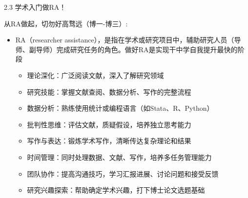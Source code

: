 \documentclass[10pt,aspectratio=43,mathserif,table]{beamer}
\begin{document}
\begin{frame}{\small 2.3 学术入门做RA！}
	
	\begin{block}{\footnotesize 从RA做起，切勿好高骛远（博一-博三）:}
		\begin{itemize}
			\item \footnotesize RA（researcher assistance），是指在学术或研究项目中，辅助研究人员（导师、副导师）完成研究任务的角色。做好RA是实现干中学自我提升最快的阶段
			\vspace{0.4em}
			\begin{itemize}
				\item \footnotesize 理论深化：广泛阅读文献，深入了解研究领域
			\end{itemize}
			\vspace{0.4em}
			\begin{itemize}
				\item \footnotesize 研究技能：掌握文献查阅、数据分析、写作的完整流程
			\end{itemize}
			\vspace{0.4em}
			\begin{itemize}
				\item \footnotesize 数据分析：熟练使用统计或编程语言（如Stata、R、Python）
			\end{itemize}
			\vspace{0.4em}
			\begin{itemize}
				\item \footnotesize 批判性思维：评估文献，质疑假设，培养独立思考能力
			\end{itemize}
			\vspace{0.4em}
			\begin{itemize}
				\item \footnotesize 写作与表达：锻炼学术写作，清晰传达复杂理论和结果
			\end{itemize}
			\vspace{0.4em}
			\begin{itemize}
				\item \footnotesize 时间管理：同时处理数据、文献、写作，培养多任务管理能力
			\end{itemize}
			\vspace{0.4em}
			\begin{itemize}
				\item \footnotesize 团队协作：提高沟通技巧，学习汇报进展、讨论问题和接受反馈
			\end{itemize}
			\vspace{0.4em}
			\begin{itemize}
				\item \footnotesize 研究兴趣探索：帮助确定学术兴趣，打下博士论文选题基础
			\end{itemize}
			
		\end{itemize}
	\end{block}
	
\end{frame}
\end{document}
